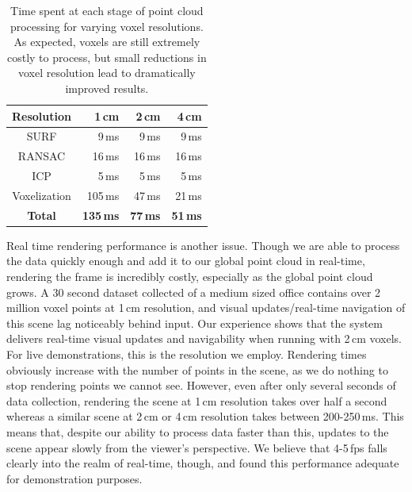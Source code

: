 \documentclass[letterpaper, 10pt, conference]{ieeeconf}
\begin{document}
\begin{table}
    \centering
    \begin{tabular}{ | c || r | r | r | }
    \hline
    Resolution & 1\,cm  & 2\,cm & 4\,cm \\
    \hline
    \hline
    SURF & 9\,ms &9\,ms & 9\,ms \\
    \hline
    RANSAC & 16\,ms & 16\,ms & 16\,ms\\
    \hline
    ICP & 5\,ms & 5\,ms & 5\,ms \\
    \hline
    Voxelization & 105\,ms & 47\,ms & 21\,ms \\
    \hline
    {\bf Total} & {\bf 135\,ms} & {\bf 77\,ms} & {\bf 51\,ms} \\
    \hline
    \end{tabular}
\caption{Time spent at each stage of point cloud processing for varying voxel
    resolutions. As expected, voxels are still extremely costly to process,
    but small reductions in voxel resolution lead to dramatically improved
    results.}
\label{tbl:match-times}
\end{table}

Real time rendering performance is another issue. Though we are able to
process the data quickly enough and add it to our global point cloud in
real-time, rendering the frame is incredibly costly, especially as the global
point cloud grows. A 30 second dataset collected of a medium sized office
contains over 2 million voxel points at 1\,cm resolution, and visual
updates/real-time navigation of this scene lag noticeably behind input. Our
experience shows that the system delivers real-time visual updates and
navigability when running with 2\,cm voxels. For live demonstrations, this is
the resolution we employ. Rendering times obviously increase with the number
of points in the scene, as we do nothing to stop rendering points we cannot
see. However, even after only several seconds of data collection, rendering
the scene at 1\,cm resolution takes over half a second whereas a similar scene
at 2\,cm or 4\,cm resolution takes between 200-250\,ms. This means that,
despite our ability to process data faster than this, updates to the scene
appear slowly from the viewer's perspective. We believe that 4-5\,fps falls
clearly into the realm of real-time, though, and found this performance
adequate for demonstration purposes.
\end{document}

